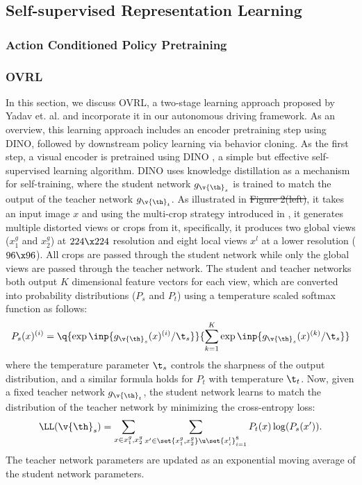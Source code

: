 \documentclass[letterpaper, 12pt]{article}
\theoremstyle{definition}
\theoremstyle{definition}
\theoremstyle{definition}
\theoremstyle{definition}
\theoremstyle{definition}
\newcommand{\vth}{\v{\th}}
\begin{document}
\subsection{Self-supervised Representation Learning}
\label{sec:org077da8b}
\subsubsection{Action Conditioned Policy Pretraining}
\label{sec:orge409b25}
\subsubsection{OVRL}
\label{sec:orgdcaae09}
In this section, we discuss OVRL\cite{Yadav2022}, a two-stage learning approach
proposed by Yadav et. al. and incorporate it in our autonomous driving
framework. As an overview, this learning approach includes an encoder
pretraining step using DINO, followed by downstream policy learning via behavior
cloning.
\label{sec:org503106c}
As the first step, a visual encoder is pretrained using DINO \cite{Caron2021}, a
simple but effective self-supervised learning algorithm. DINO uses knowledge
distillation as a mechanism for self-training, where the student network
\(g_{\vth_{s}}\) is trained to match the output of the teacher network
\(g_{\vth_{t}}\).  As illustrated in \sout{Figure 2(left)}, it takes an input image
\(x\) and using the multi-crop strategy introduced in \cite{Caron2020}, it
generates multiple distorted views or crops from it, specifically, it produces
two global views (\(x_{1}^{g}\) and \(x_{2}^{g}\)) at \(224\x 224\) resolution
and eight local views \(x^{l}\) at a lower resolution (\(96\x 96\)). All crops
are passed through the student network while only the global views are passed
through the teacher network.  The student and teacher networks both output \(K\)
dimensional feature vectors for each view, which are converted into probability
distributions (\(P_{s}\) and \(P_{t}\)) using a temperature scaled softmax
function as follows:
\[P_{s}(x)^{(i)}=\q{\exp\inp{g_{\vth_{s}}(x)^{(i)}/\t_{s}}}{\sum_{k=1}^{K}\exp\inp{g_{\vth_{s}}(x)^{(k)}/\t_{s}}}\]
where the temperature parameter \(\t_{s}\) controls the sharpness of the output
distribution, and a similar formula holds for \(P_{t}\) with temperature
\(\t_{t}\). Now, given a fixed teacher network \(g_{\vth_{t}}\), the student
network learns to match the distribution of the teacher network by minimizing
the cross-entropy loss:
\[\LL(\vth_{s})=\sum_{x\in{x_{1}^{g},x_{2}^{g}}}\sum_{x'\in
\set{x_{1}^{g},x_{2}^{g}}\u\set{x^{l}_{i}}_{i=1}^{8}}P_{t}(x)\log(P_{s}(x')).\] The
teacher network parameters are updated as an exponential moving average of the
student network parameters.
\end{document}
